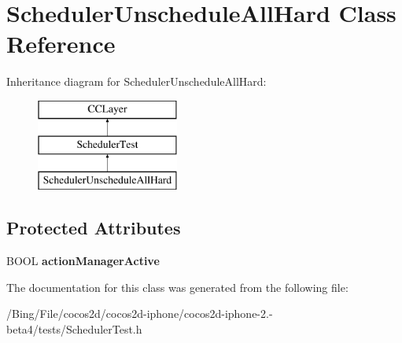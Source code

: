 \hypertarget{interface_scheduler_unschedule_all_hard}{\section{Scheduler\-Unschedule\-All\-Hard Class Reference}
\label{interface_scheduler_unschedule_all_hard}
}
Inheritance diagram for Scheduler\-Unschedule\-All\-Hard\-:\begin{figure}[H]
\begin{center}
\leavevmode
\includegraphics[height=3.000000cm]{interface_scheduler_unschedule_all_hard}
\end{center}
\end{figure}
\subsection*{Protected Attributes}
\begin{DoxyCompactItemize}
\item 
\hypertarget{interface_scheduler_unschedule_all_hard_a6597d8fc1e9d0be37e476d7235dde04e}{B\-O\-O\-L {\bfseries action\-Manager\-Active}}\label{interface_scheduler_unschedule_all_hard_a6597d8fc1e9d0be37e476d7235dde04e}

\end{DoxyCompactItemize}


The documentation for this class was generated from the following file\-:\begin{DoxyCompactItemize}
\item 
/\-Bing/\-File/cocos2d/cocos2d-\/iphone/cocos2d-\/iphone-\/2.-\/beta4/tests/Scheduler\-Test.\-h\end{DoxyCompactItemize}
